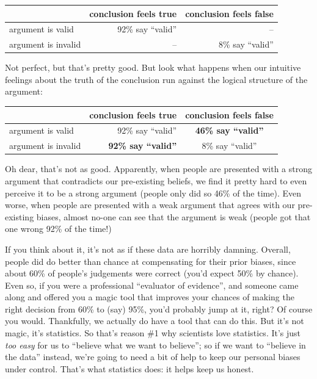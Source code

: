 \documentclass[
]{book}
\begin{document}
\begin{longtable}[]{@{}lrr@{}}
\toprule\noalign{}
& conclusion feels true & conclusion feels false \\
\midrule\noalign{}
\endhead
\bottomrule\noalign{}
\endlastfoot
argument is valid & 92\% say ``valid'' & -- \\
argument is invalid & -- & 8\% say ``valid'' \\
\end{longtable}

Not perfect, but that's pretty good. But look what happens when our intuitive feelings about the truth of the conclusion run against the logical structure of the argument:

\begin{longtable}[]{@{}lrc@{}}
\toprule\noalign{}
& conclusion feels true & conclusion feels false \\
\midrule\noalign{}
\endhead
\bottomrule\noalign{}
\endlastfoot
argument is valid & 92\% say ``valid'' & \textbf{46\% say ``valid''} \\
argument is invalid & \textbf{92\% say ``valid''} & 8\% say ``valid'' \\
\end{longtable}

Oh dear, that's not as good. Apparently, when people are presented with a strong argument that contradicts our pre-existing beliefs, we find it pretty hard to even perceive it to be a strong argument (people only did so 46\% of the time). Even worse, when people are presented with a weak argument that agrees with our pre-existing biases, almost no-one can see that the argument is weak (people got that one wrong 92\% of the time!)

If you think about it, it's not as if these data are horribly damning. Overall, people did do better than chance at compensating for their prior biases, since about 60\% of people's judgements were correct (you'd expect 50\% by chance). Even so, if you were a professional ``evaluator of evidence'', and someone came along and offered you a magic tool that improves your chances of making the right decision from 60\% to (say) 95\%, you'd probably jump at it, right? Of course you would. Thankfully, we actually do have a tool that can do this. But it's not magic, it's statistics. So that's reason \#1 why scientists love statistics. It's just \emph{too easy} for us to ``believe what we want to believe''; so if we want to ``believe in the data'' instead, we're going to need a bit of help to keep our personal biases under control. That's what statistics does: it helps keep us honest.
\end{document}

